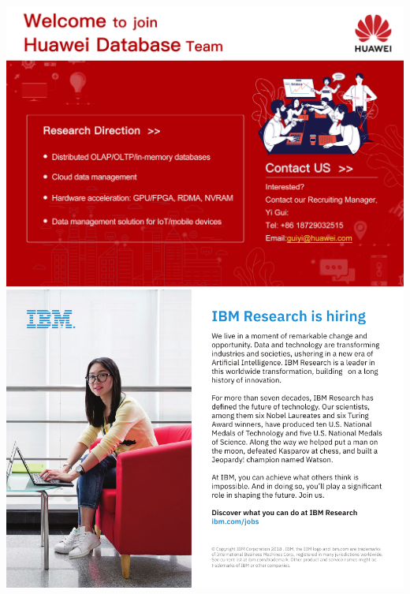 \includegraphics[height=.49\textheight,width=\textwidth,keepaspectratio]{ads/huawei.jpg}
\vfill
\includegraphics[height=.49\textheight,width=\textwidth,keepaspectratio]{ads/ibm.pdf}
\pagebreak

